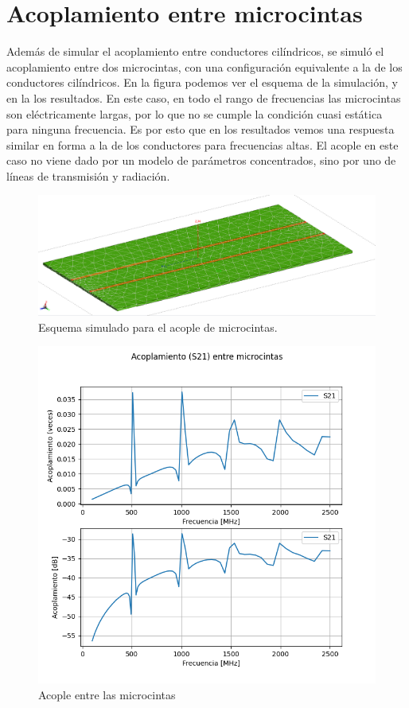 \section{Acoplamiento entre microcintas}%
\label{sec:acoplamiento_entre_microcintas}

Además de simular el acoplamiento entre conductores cilíndricos, se simuló el acoplamiento entre dos microcintas, con una configuración equivalente a la de los conductores cilíndricos. En la figura podemos ver el esquema de la simulación, y en la los resultados. En este caso, en todo el rango de frecuencias las microcintas son eléctricamente largas, por lo que no se cumple la condición cuasi estática para ninguna frecuencia. Es por esto que en los resultados vemos una respuesta similar en forma a la de los conductores para frecuencias altas. El acople en este caso no viene dado por un modelo de parámetros concentrados, sino por uno de líneas de transmisión y radiación.

\begin{figure}[ht]
  \centering
  \includegraphics[width=0.6\linewidth]{imagenes/simulacion_microcintas.PNG}
  \caption{Esquema simulado para el acople de microcintas.}%
  \label{fig:imagenes/simulacion_microcintas}
\end{figure}

\begin{figure}[ht]
  \centering
  \includegraphics[width=0.6\linewidth]{imagenes/acoplamiento_microcintas_resultado.png}
  \caption{Acople entre las microcintas}%
  \label{fig:imagenes/acoplamiento_microcintas_resultado}
\end{figure}
